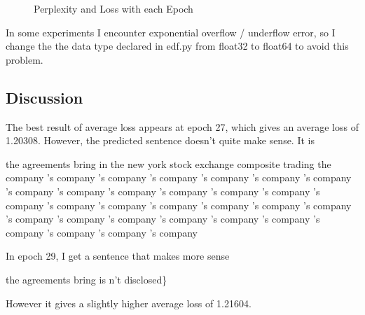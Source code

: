 \documentclass{article}
\begin{document}
\begin{figure}
\centering
{}
\caption{Perplexity and Loss with each Epoch}
\label{fig:res}
\end{figure}

In some experiments I encounter exponential overflow / underflow error, so I
change the the data type declared in edf.py from float32 to float64 to avoid
this problem.

\subsection*{Discussion}

The best result of average loss appears at epoch 27, which gives an average loss
of 1.20308. However, the predicted sentence doesn't quite make sense. It is
\begin{tcolorbox}
the agreements bring in the new york stock exchange composite trading the
company 's company 's company 's company 's company 's company 's company 's
company 's company 's company 's company 's company 's company 's company 's
company 's company 's company 's company 's company 's company 's company 's
company 's company 's company 's company 's company 's company 's company 's
company 's company
\end{tcolorbox}
In epoch 29, I get a sentence that makes more sense
\begin{tcolorbox}
the agreements bring is n't disclosed\}
\end{tcolorbox}
However it gives a slightly higher average loss of 1.21604.
\end{document}
